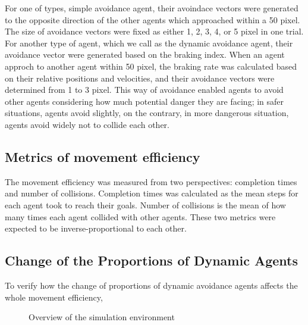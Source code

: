 \documentclass[letterpaper, 10 pt, conference]{ieeeconf}  %
\begin{document}
For one of types, simple avoidance agent, their avoindace vectors were generated to the opposite direction of the other agents which approached within a 50 pixel. The size of avoidance vectors were fixed as either 1, 2, 3, 4, or 5 pixel in one trial. 
For another type of agent, which we call as the dynamic avoidance agent, their avoidance vector were generated based on the braking index. When an agent approch to another agent within 50 pixel, the braking rate was calculated based on their relative positions and velocities, and their avoidance vectors were determined from 1 to 3 pixel. This way of avoidance enabled agents to avoid other agents considering how much potential danger they are facing; in safer situations, agents avoid slightly, on the contrary, in more dangerous situation, agents avoid widely not to collide each other. 

\subsection{Metrics of movement efficiency}
The movement efficiency was measured from two perspectives: completion times and number of collisions. Completion times was calculated as the mean steps for each agent took to reach their goals. Number of collisions is the mean of how many times each agent collided with other agents. These two metrics were expected to be inverse-proportional to each other.

\subsection{Change of the Proportions of Dynamic Agents}
To verify how the change of proportions of dynamic avoidance agents affects the whole movement efficiency, 

\begin{figure}[thpb]
   \centering
   \caption{Overview of the simulation environment}
   \label{fig:sim_env}
\end{figure}
\end{document}
